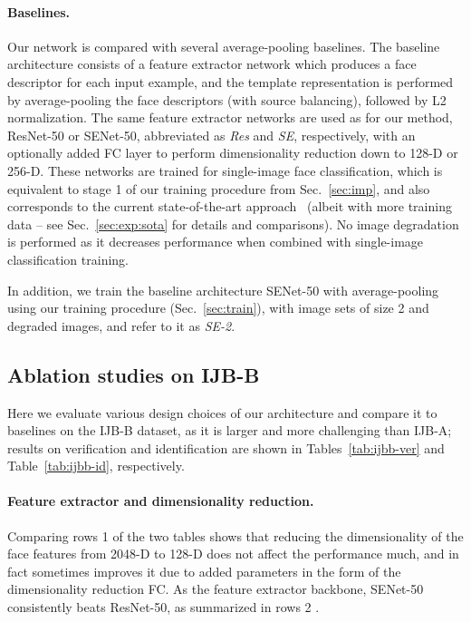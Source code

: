 \documentclass[runningheads]{llncs}
\begin{document}
\paragraph{Baselines.}
Our network is compared with several average-pooling baselines.
The baseline architecture consists of a feature extractor network
which produces a face descriptor for each input example,
and the template representation is performed by
average-pooling the face descriptors
(with source balancing), followed by
L2 normalization.
The same feature extractor networks are used
as for our method, ResNet-50 or SENet-50,
abbreviated as \emph{Res} and \emph{SE}, respectively,
with an optionally added FC layer to perform dimensionality reduction
down to 128-D or 256-D.
These networks are trained for single-image face classification,
which is equivalent to stage 1
of our training procedure from Sec.~\ref{sec:imp},
and also corresponds to the current state-of-the-art
approach~\cite{Cao18} (albeit with more training data
-- see Sec.~\ref{sec:exp:sota} for details and comparisons).
No image degradation is performed as it decreases performance
when combined with single-image classification training.

In addition, we train the baseline architecture SENet-50 with
average-pooling
using our training procedure (Sec.~\ref{sec:train}),
\ie with image sets of size 2 and degraded images,
and refer to it as \emph{SE-2}.



\subsection{Ablation studies on IJB-B}

Here we evaluate various design choices of our architecture
and compare it to baselines on the IJB-B dataset,
as it is larger and more challenging than IJB-A;
results on verification and identification are shown in
Tables~\ref{tab:ijbb-ver} and Table~\ref{tab:ijbb-id},
respectively.

\paragraph{Feature extractor and dimensionality reduction.}
Comparing rows 1  of the two tables shows
that reducing the dimensionality of the face features
from 2048-D to 128-D does not affect the performance much,
and in fact sometimes improves it due to added parameters
in the form of the dimensionality reduction FC.
As the feature extractor backbone,
SENet-50 consistently beats ResNet-50, 
as summarized in rows 2 .
\end{document}
